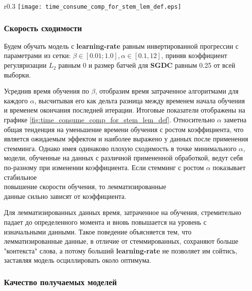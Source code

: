 \documentclass{article}
\begin{document}
\begin{wrapfigure}[15]{r}{0.3\textwidth}
    \centering
    \texttt{[image: time\_consume\_comp\_for\_stem\_lem\_def.eps]}
    \caption{Общая зависимость времени обучения от \textbf{batch-size}}
    \label{fig:time_consume_comp_for_stem_lem_def}
\end{wrapfigure}


        \subsubsection{Скорость сходимости}

            Будем обучать модель с \textbf{learning-rate} равным инвертированной прогрессии с параметрами из сетки: $\beta \in [0.01; 1.0], \alpha \in [0.1, 12]$, приняв коэффициент регуляризации $L_2$ равным 0 и размер батчей для \textbf{SGDC} равным 0.25 от всей выборки.

            Усреднив время обучения по $\beta$, отобразим время затраченное алгоритмами для каждого $\alpha$, высчитывая его как дельта разница между временем начала обучения и временем окончания последней итерации. Итоговые показатели отображены на графике \ref{fig:time_consume_comp_for_stem_lem_def}. Относительно $\alpha$ заметна общая тенденция на уменьшение времени обучения с ростом коэффициента, что является ожидаемым эффектом и наиболее выражено у данных после применения стемминга. Однако имея одинаково плохую сходимость в точке минимального $\alpha$, модели, обученные на данных с различной примененной обработкой, ведут себя по-разному при изменении коэффициента. Если стемминг с ростом $\alpha$ показывает стабильное \\повышение скорости обучения, то лемматизированные \\данные сильно зависят от коэффициента.
            
            Для лемматизированных данных время, затраченное на обучения, стремительно падает до определенного момента и вновь повышается на уровень с изначальными данными. Такое поведение объясняется тем, что лемматизированные данные, в отличие от стеммированных, сохраняют больше "контекста" слова, а потому больший \textbf{learning-rate} не позволяет им сойтись, заставляя модель осциллировать около оптимума.

        \subsubsection{Качество получаемых моделей}
\end{document}
